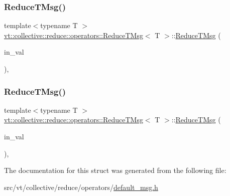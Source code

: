 \mbox{\label{structvt_1_1collective_1_1reduce_1_1operators_1_1_reduce_t_msg_a0ebf2a9f155512254ef185d2a8f57fd5}} 
\subsubsection{\texorpdfstring{Reduce\+T\+Msg()}{ReduceTMsg()}\hspace{0.1cm}{\footnotesize\ttfamily [2/3]}}
{\footnotesize\ttfamily template$<$typename T $>$ \\
\hyperlink{structvt_1_1collective_1_1reduce_1_1operators_1_1_reduce_t_msg}{vt\+::collective\+::reduce\+::operators\+::\+Reduce\+T\+Msg}$<$ T $>$\+::\hyperlink{structvt_1_1collective_1_1reduce_1_1operators_1_1_reduce_t_msg}{Reduce\+T\+Msg} (\begin{DoxyParamCaption}\item[{\hyperlink{structvt_1_1collective_1_1reduce_1_1operators_1_1_reduce_t_msg_ad9a7434e9e8b0afd4fcb13307058e698}{Data\+Type} \&\&}]{in\+\_\+val }\end{DoxyParamCaption})\hspace{0.3cm}{\ttfamily [inline]}, {\ttfamily [explicit]}}

\mbox{\label{structvt_1_1collective_1_1reduce_1_1operators_1_1_reduce_t_msg_afddd1ed7bed2d1946cacbf6b080696d4}} 
\subsubsection{\texorpdfstring{Reduce\+T\+Msg()}{ReduceTMsg()}\hspace{0.1cm}{\footnotesize\ttfamily [3/3]}}
{\footnotesize\ttfamily template$<$typename T $>$ \\
\hyperlink{structvt_1_1collective_1_1reduce_1_1operators_1_1_reduce_t_msg}{vt\+::collective\+::reduce\+::operators\+::\+Reduce\+T\+Msg}$<$ T $>$\+::\hyperlink{structvt_1_1collective_1_1reduce_1_1operators_1_1_reduce_t_msg}{Reduce\+T\+Msg} (\begin{DoxyParamCaption}\item[{\hyperlink{structvt_1_1collective_1_1reduce_1_1operators_1_1_reduce_t_msg_ad9a7434e9e8b0afd4fcb13307058e698}{Data\+Type} const \&}]{in\+\_\+val }\end{DoxyParamCaption})\hspace{0.3cm}{\ttfamily [inline]}, {\ttfamily [explicit]}}



The documentation for this struct was generated from the following file\+:\begin{DoxyCompactItemize}
\item 
src/vt/collective/reduce/operators/\hyperlink{default__msg_8h}{default\+\_\+msg.\+h}\end{DoxyCompactItemize}
